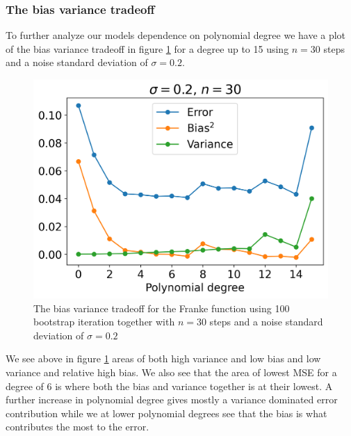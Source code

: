 \documentclass[12pt]{article}
\begin{document}
\subsubsection{The bias variance tradeoff}

To further analyze our models dependence on polynomial degree we have a plot of the bias variance tradeoff in figure \ref{fig:bias_variance} for a degree up to 15 using $n=30$ steps and a noise standard deviation of $\sigma=0.2$.
\begin{figure}[H]
  \centering
  \includegraphics[width=\textwidth]{../figures/bias_variance_tradeoff.png}
  \caption{The bias variance tradeoff for the Franke function using 100 bootstrap iteration together with $n=30$ steps and a noise standard deviation of $\sigma=0.2$}
  \label{fig:bias_variance}
\end{figure}
We see above in figure \ref{fig:bias_variance} areas of both high variance and low bias and low variance and relative high bias. We also see that the area of lowest MSE for a degree of 6 is where both the bias and variance together is at their lowest. A further increase in polynomial degree gives mostly a variance dominated error contribution while we at lower polynomial degrees see that the bias is what contributes the most to the error.
\end{document}
